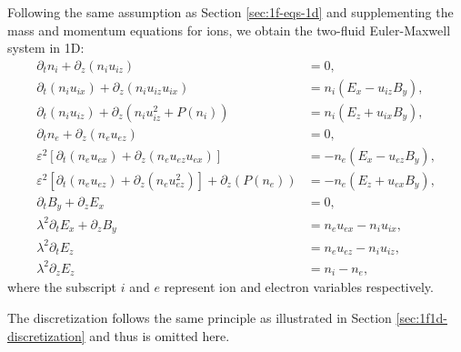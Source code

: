 \documentclass{report}
\begin{document}
Following the same assumption as Section \ref{sec:1f-eqs-1d} and supplementing the mass and momentum equations for ions, we obtain the two-fluid Euler-Maxwell system in 1D:
\begin{align*}
    \partial_t n_i + \partial_z(n_i u_{iz}) &= 0, \\
    \partial_t(n_i u_{ix}) + \partial_z(n_i u_{iz} u_{ix}) &= n_i(E_x - u_{iz} B_y), \\
    \partial_t(n_i u_{iz}) + \partial_z(n_i u_{iz}^2 + P(n_i)) &= n_i(E_z + u_{ix} B_y), \\
    \partial_t n_e + \partial_z(n_e u_{ez}) &= 0, \\
    \varepsilon^2 [ \partial_t(n_e u_{ex}) + \partial_z(n_e u_{ez} u_{ex}) ] &= - n_e(E_x - u_{ez} B_y), \\
    \varepsilon^2 [ \partial_t(n_e u_{ez}) + \partial_z(n_e u_{ez}^2) ] + \partial_z(P(n_e)) &= -n_e(E_z + u_{ex} B_y), \\
    \partial_t B_y + \partial_z E_x &= 0, \\
    \lambda^2 \partial_t E_x + \partial_z B_y &= n_e u_{ex} - n_i u_{ix}, \\
    \lambda^2 \partial_t E_z &= n_e u_{ez} - n_i u_{iz}, \\
    \lambda^2 \partial_z E_z &= n_i - n_e,
\end{align*}
where the subscript $i$ and $e$ represent ion and electron variables respectively.

The discretization follows the same principle as illustrated in Section \ref{sec:1f1d-discretization} and thus is omitted here.
\end{document}
